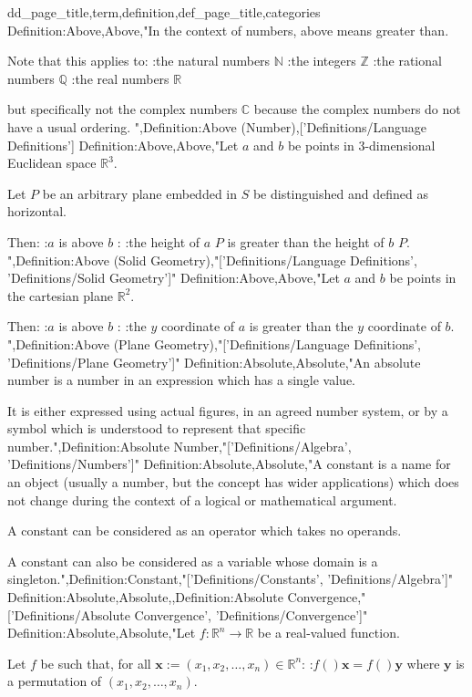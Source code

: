 
dd_page_title,term,definition,def_page_title,categories
Definition:Above,Above,"In the context of numbers, above means greater than.

Note that this applies to:
:the natural numbers $\mathbb N$
:the integers $\mathbb Z$
:the rational numbers $\mathbb Q$
:the real numbers $\mathbb R$

but specifically not the complex numbers $\mathbb C$ because the complex numbers do not have a usual ordering.
",Definition:Above (Number),['Definitions/Language Definitions']
Definition:Above,Above,"Let $a$ and $b$ be points in $3$-dimensional Euclidean space $\mathbb R^3$.

Let $P$ be an arbitrary plane embedded in $S$ be distinguished and defined as horizontal.

Then:
:$a$ is above $b$
:
:the height of $a$  $P$ is greater than the height of $b$  $P$.
",Definition:Above (Solid Geometry),"['Definitions/Language Definitions', 'Definitions/Solid Geometry']"
Definition:Above,Above,"Let $a$ and $b$ be points in the cartesian plane $\mathbb R^2$.

Then:
:$a$ is above $b$
:
:the $y$ coordinate of $a$ is greater than the $y$ coordinate of $b$.
",Definition:Above (Plane Geometry),"['Definitions/Language Definitions', 'Definitions/Plane Geometry']"
Definition:Absolute,Absolute,"An absolute number is a number in an expression which has a single value.

It is either expressed using actual figures, in an agreed number system, or by a symbol which is understood to represent that specific number.",Definition:Absolute Number,"['Definitions/Algebra', 'Definitions/Numbers']"
Definition:Absolute,Absolute,"A constant is a name for an object (usually a number, but the concept has wider applications) which does not change during the context of a logical or mathematical argument.


A constant can be considered as an operator which takes no operands.

A constant can also be considered as a variable whose domain is a singleton.",Definition:Constant,"['Definitions/Constants', 'Definitions/Algebra']"
Definition:Absolute,Absolute,,Definition:Absolute Convergence,"['Definitions/Absolute Convergence', 'Definitions/Convergence']"
Definition:Absolute,Absolute,"Let $f: \mathbb R^n \to \mathbb R$ be a real-valued function.

Let $f$ be such that, for all $\mathbf x := \left( x_1, x_2, \ldots, x_n \right) \in \mathbb R^n$:
:$f \left(   \right){\mathbf x} = f \left(   \right){\mathbf y}$
where $\mathbf y$ is a permutation of $\left( x_1, x_2, \ldots, x_n \right)$.

